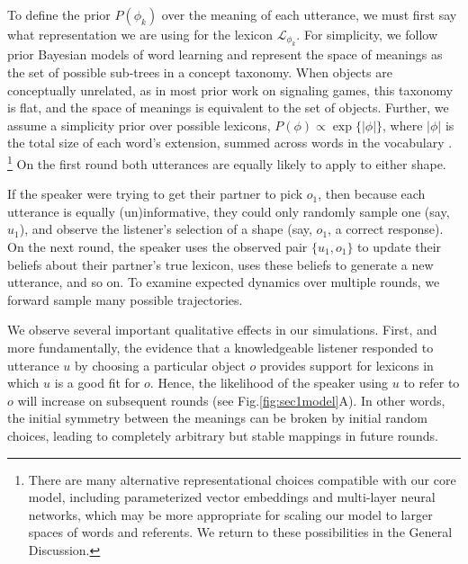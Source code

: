 To define the prior $P(\phi_k)$ over the meaning of each utterance, we must first say what representation we are using for the lexicon $\mathcal{L}_{\phi_k}$.
For simplicity, we follow prior Bayesian models of word learning \cite{XuTenenbaum07_WordLearningBayesian} and represent the space of meanings as the set of possible sub-trees in a concept taxonomy.
When objects are conceptually unrelated, as in most prior work on signaling games, this taxonomy is flat, and the space of meanings is equivalent to the set of objects.
Further, we assume a simplicity prior over possible lexicons, $P(\phi) \propto \exp\{|\phi|\}$, where $|\phi|$ is the total size of each word's extension, summed across words in the vocabulary \cite{FrankGoodmanTenenbaum09_Wurwur}.
\footnote{There are many alternative representational choices compatible with our core model, including parameterized vector embeddings and multi-layer neural networks, which may be more appropriate for scaling our model to larger spaces of words and referents. We return to these possibilities in the General Discussion.}
On the first round both utterances are equally likely to apply to either shape. 

If the speaker were trying to get their partner to pick $o_1$, then because each utterance is equally (un)informative, they could only randomly sample one (say, $u_1$), and observe the listener's selection of a shape (say, $o_1$, a correct response). 
On the next round, the speaker uses the observed pair $\{u_1, o_1\}$ to update their beliefs about their partner's true lexicon, uses these beliefs to generate a new utterance, and so on. 
To examine expected dynamics over multiple rounds, we forward sample many possible trajectories.

We observe several important qualitative effects in our simulations. 
First, and more fundamentally, the evidence that a knowledgeable listener responded to utterance $u$ by choosing a particular object $o$ provides support for lexicons in which $u$ is a good fit for $o$. 
Hence, the likelihood of the speaker using $u$ to refer to $o$ will increase on subsequent rounds (see Fig.\ref{fig:sec1model}A). 
In other words, the initial symmetry between the meanings can be broken by initial random choices, leading to completely arbitrary but stable mappings in future rounds. 

